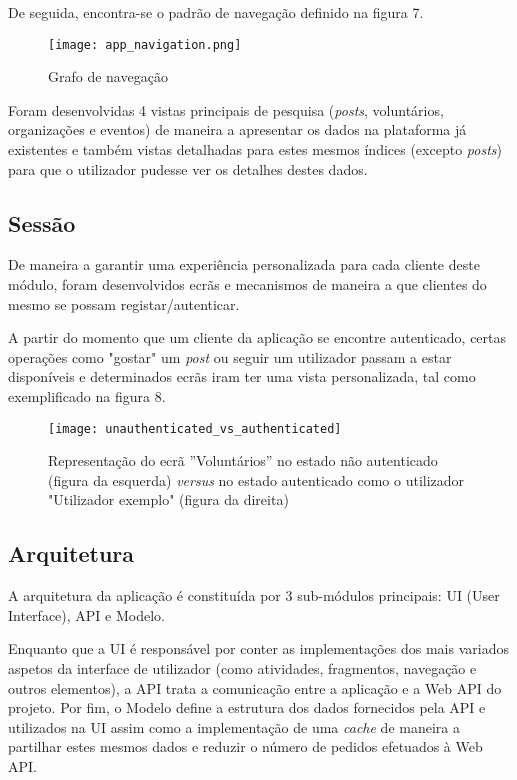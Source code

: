 \bigskip

De seguida, encontra-se o padrão de navegação definido na figura 7.

\newpage

\begin{figure}[h]
	\centering
	\texttt{[image: app\_navigation.png]}
	\caption{Grafo de navegação}
\end{figure}

Foram desenvolvidas 4 vistas principais de pesquisa (\textit{posts}, voluntários, organizações e eventos) de maneira a apresentar os dados na plataforma já existentes e também vistas detalhadas para estes mesmos índices (excepto \textit{posts}) para que o utilizador pudesse ver os detalhes destes dados.

\bigskip

\subsection{Sessão}

De maneira a garantir uma experiência personalizada para cada cliente deste módulo, foram desenvolvidos ecrãs e mecanismos de maneira a que clientes do mesmo se possam registar/autenticar.

\bigskip

A partir do momento que um cliente da aplicação se encontre autenticado, certas operações como "gostar" um \textit{post} ou seguir um utilizador passam a estar disponíveis e determinados ecrãs iram ter uma vista personalizada, tal como exemplificado na figura 8.

\newpage

\begin{figure}[h]
	\centering
	\texttt{[image: unauthenticated\_vs\_authenticated]}
	\caption{Representação do ecrã ''Voluntários'' no estado não autenticado (figura da esquerda) \textit{versus} no estado autenticado como o utilizador "Utilizador exemplo" (figura da direita)}
\end{figure}

\subsection{Arquitetura}

A arquitetura da aplicação é constituída por 3 sub-módulos principais: UI (User Interface), API e Modelo.

\medskip

Enquanto que a UI é responsável por conter as implementações dos mais variados aspetos da interface de utilizador (como atividades, fragmentos, navegação e outros elementos), a API trata a comunicação entre a aplicação e a Web API do projeto. Por fim, o Modelo define a estrutura dos dados fornecidos pela API e utilizados na UI assim como a implementação de uma \textit{cache} de maneira a partilhar estes mesmos dados e reduzir o número de pedidos efetuados à Web API.

